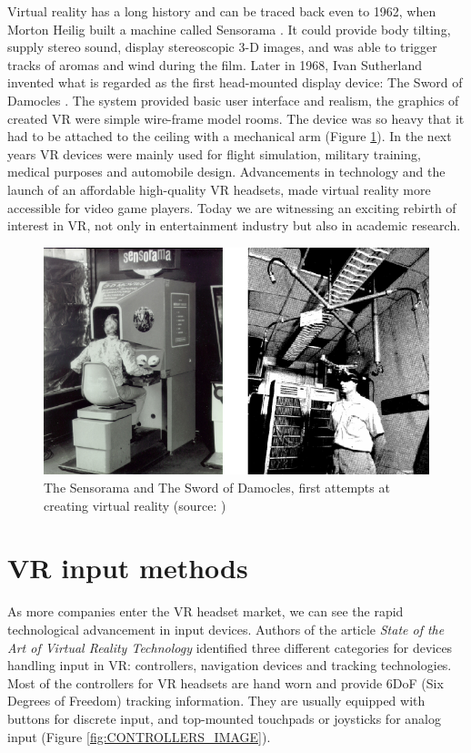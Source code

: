 Virtual reality has a long history and can be traced back even to 1962, when Morton Heilig built a machine called Sensorama \cite{SENSORAMA}. It could provide body tilting, supply stereo sound, display stereoscopic 3-D images, and was able to trigger tracks of aromas and wind during the film. Later in 1968, Ivan Sutherland invented what is regarded as the first head-mounted display device: The Sword of Damocles \cite{DAMOCLES}. The system provided basic user interface and realism, the graphics of created VR were simple wire-frame model rooms. The device was so heavy that it had to be attached to the ceiling with a mechanical arm (Figure \ref{fig:FIRST_VR}). In the next years VR devices were mainly used for flight simulation, military training, medical purposes and automobile design. Advancements in technology and the launch of an affordable high-quality VR headsets, made virtual reality more accessible for video game players. Today we are witnessing an exciting rebirth of interest in VR, not only in entertainment industry but also in academic research.

\begin{figure}[th]
\centering
\includegraphics[width=1\textwidth]{img/first_vr.png}
\caption{The Sensorama and The Sword of Damocles, first attempts at creating virtual reality (source: \cite{SENSORAMA_IMAGE}\cite{DAMOCLES})}
\label{fig:FIRST_VR}
\end{figure}

\section{VR input methods}

As more companies enter the VR headset market, we can see the rapid technological advancement in input devices. Authors of the article \textit{State of the Art of Virtual Reality Technology} \cite{VR_TECHNOLOGY} identified three different categories for devices handling input in VR: controllers, navigation devices and tracking technologies. Most of the controllers for VR headsets are hand worn and provide 6DoF (Six Degrees of Freedom) tracking information. They are usually equipped with buttons for discrete input, and top-mounted touchpads or joysticks for analog input (Figure \ref{fig:CONTROLLERS_IMAGE}).

